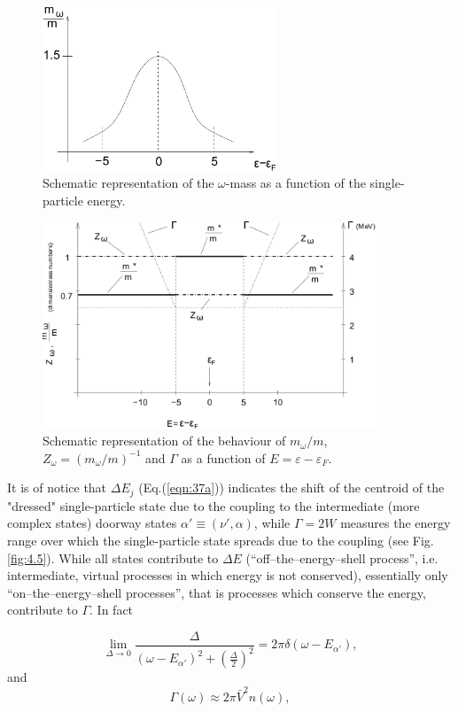 \begin{figure}[h!]
\centerline {
\includegraphics*[width=7cm]{introduccion/figs/figintroD3}
}
\caption{Schematic representation of the $\omega$-mass as a function of the single-particle energy.}
\label{fig:4.3}
\end{figure}

\begin{figure}[h!]
\centerline {
\includegraphics*[width=10cm]{introduccion/figs/figintroD4}
}
\caption{Schematic representation of the behaviour of $m_{\omega}/m$, $Z_{\omega}=(m_{\omega}/m)^{-1}$ and $\Gamma$ as a function of $E = \varepsilon - \varepsilon_F$.}
\label{fig:4.4}
\end{figure}


It is of notice that $\Delta E_j$ (Eq.(\ref{eqn:37a})) indicates the shift  of the  centroid of the "dressed" single-particle state due to the coupling to the intermediate (more complex states) doorway states $\alpha' \equiv (\nu',\alpha)$, while $\Gamma = 2W$ measures the energy range over which the single-particle state spreads due to the coupling (see Fig.\ref{fig:4.5}). While all states contribute to $\Delta E$ (``off--the--energy--shell process'', i.e. intermediate, virtual processes in which energy is not conserved), essentially only ``on--the--energy--shell processes'', that is processes which conserve the energy, contribute to $\Gamma$. In fact

\begin{equation}
\nonumber
\lim_{\Delta \rightarrow 0} \frac{\Delta}{(\omega -E_{\alpha'})^2 + \left( \frac{\Delta}{2} \right)^2} = 2\pi\delta(\omega-E_{\alpha'}) ,
\end{equation}
and
\begin{equation}
\Gamma(\omega) \approx 2\pi \bar{V}^2 n(\omega) ,
\label{eqn:41}
\end{equation}

